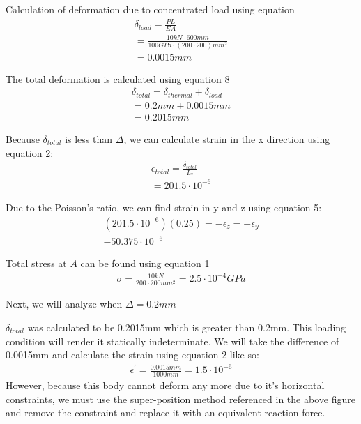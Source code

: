 \documentclass[12pt]{article}
\begin{document}
Calculation of deformation due to concentrated load using equation 
\begin{gather*} \label{deform_load_calc_delta03}
\delta_{load} = \frac{PL}{EA} \\
= \frac{10 kN \cdot 600 mm}{100 GPa \cdot (200 \cdot 200) mm^{2}} \\
=0.0015 mm
\end{gather*}

The total deformation is calculated using equation 8
\begin{gather*} 
\delta_{total} = \delta_{thermal} + \delta_{load}\\
= 0.2mm + 0.0015mm\\
=0.2015 mm
\end{gather*}

Because $\delta_{total}$ is less than $\Delta$, we can calculate strain in the x direction using equation 2:
\begin{gather*}
\epsilon_{total} = \frac{\delta_{total}}{L_{º}}\\
=201.5 \cdot 10^{-6}
\end{gather*}

Due to the Poisson's ratio, we can find strain in y and z using equation 5:
\begin{gather*}
(201.5 \cdot 10^{-6})(0.25) =- \epsilon_{z} = -\epsilon_{y}\\
-50.375 \cdot 10^{-6}
\end{gather*}

Total stress at $A$ can be found using equation 1
\begin{gather*}
\sigma = \frac{10 kN}{200 \cdot 200 mm^{2}} = 2.5 \cdot 10^{-4} GPa
\end{gather*}
\newline

Next, we will analyze when $\Delta = 0.2mm$
\newline

$\delta_{total}$ was calculated to be 0.2015mm which is greater than 0.2mm. This loading condition will render it statically indeterminate. We will take the difference of 0.0015mm and calculate the strain using equation 2 like so:
\begin{gather} 
\epsilon^{'} = \frac{0.0015 mm}{1000mm} = 1.5 \cdot 10^{-6}
\end{gather}
However, because this body cannot deform any more due to it's horizontal constraints, we must use the super-position method referenced in the above figure and remove the constraint and replace it with an equivalent reaction force.
\end{document}
